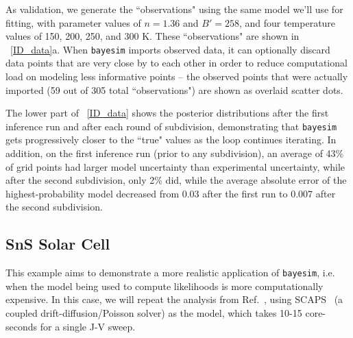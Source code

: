 \documentclass[aps,prl,amsmath,amssymb,superscriptaddress,notitlepage,groupedaddress]{revtex4-1}
\begin{document}
    As validation, we generate the ``observations" using the same model we'll use for fitting, with parameter values of $n=1.36$ and $B'=258$, and four temperature values of 150, 200, 250, and 300 K. These ``observations" are shown in ~\autoref{ID_data}a. When \texttt{bayesim} imports observed data, it can optionally discard data points that are very close by to each other in order to reduce computational load on modeling less informative points -- the observed points that were actually imported (59 out of 305 total ``observations") are shown as overlaid scatter dots.

    The lower part of ~\autoref{ID_data} shows the posterior distributions after the first inference run and after each round of subdivision, demonstrating that \texttt{bayesim} gets progressively closer to the ``true" values as the loop continues iterating. In addition, on the first inference run (prior to any subdivision), an average of 43\% of grid points had larger model uncertainty than experimental uncertainty, while after the second subdivision, only 2\% did, while the average absolute error of the highest-probability model decreased from 0.03 after the first run to 0.007 after the second subdivision.

  \subsection{SnS Solar Cell}
    This example aims to demonstrate a more realistic application of \texttt{bayesim}, i.e. when the model being used to compute likelihoods is more computationally expensive. In this case, we will repeat the analysis from Ref.~\cite{SnSJoule}, using SCAPS~\cite{SCAPS} (a coupled drift-diffusion/Poisson solver) as the model, which takes 10-15 core-seconds for a single J-V sweep.
\end{document}

